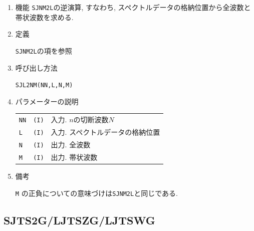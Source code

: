 \documentclass[a4j]{jarticle}
\begin{document}
\begin{enumerate}

\item 機能 
{\tt SJNM2L}の逆演算, すなわち, スペクトルデータの格納位置から全波数と
帯状波数を求める.

\item 定義

{\tt SJNM2L}の項を参照

\item 呼び出し方法 
    
{\tt SJL2NM(NN,L,N,M)}
  
\item パラメーターの説明 

\begin{tabular}{lll}
{\tt NN} & {\tt (I)} & 入力. $n$の切断波数$N$\\
{\tt L} & {\tt (I)} & 入力. スペクトルデータの格納位置\\
{\tt N} & {\tt (I)} & 出力. 全波数\\
{\tt M} & {\tt (I)} & 出力. 帯状波数
\end{tabular}

\item 備考

 {\tt M} の正負についての意味づけは{\tt SJNM2L}と同じである.

\end{enumerate}


\subsection{SJTS2G/LJTSZG/LJTSWG}
\end{document}
